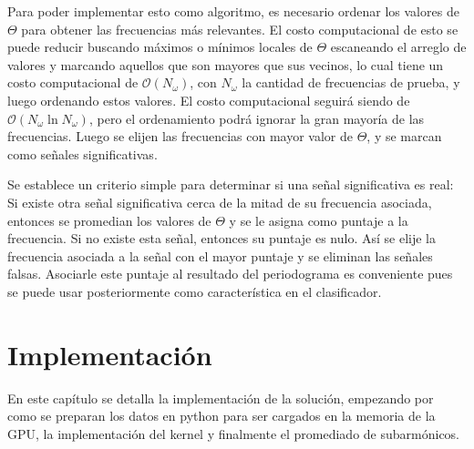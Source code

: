 Para poder implementar esto como algoritmo, es necesario ordenar los valores de $\Theta$ para obtener las frecuencias más relevantes. El costo computacional de esto se puede reducir buscando máximos o mínimos locales de $\Theta$ escaneando el arreglo de valores y marcando aquellos que son mayores que sus vecinos, lo cual tiene un costo computacional de $\mathcal O(N_\omega)$, con $N_\omega$ la cantidad de frecuencias de prueba, y luego ordenando estos valores. El costo computacional seguirá siendo de $\mathcal O (N_\omega \ln N_\omega)$, pero el ordenamiento podrá ignorar la gran mayoría de las frecuencias. Luego se elijen las frecuencias con mayor valor de $\Theta$, y se marcan como señales significativas.

Se establece un criterio simple para determinar si una señal significativa es real: Si existe otra señal significativa cerca de la mitad de su frecuencia asociada, entonces se promedian los valores de $\Theta$ y se le asigna como puntaje a la frecuencia. Si no existe esta señal, entonces su puntaje es nulo. Así se elije la frecuencia asociada a la señal con el mayor puntaje y se eliminan las señales falsas. Asociarle este puntaje al resultado del periodograma es conveniente pues se puede usar posteriormente como característica en el clasificador.

\chapter{Implementación}\label{chap:implementación}
En este capítulo se detalla la implementación de la solución, empezando por como se preparan los datos en python para ser cargados en la memoria de la GPU, la implementación del kernel y finalmente el promediado de subarmónicos.
